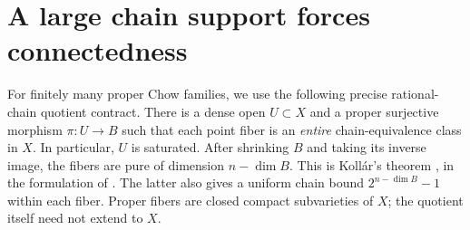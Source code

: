 \documentclass[11pt]{article}
\theoremstyle{definition}\newtheorem{definition}[theorem]{Definition}
\theoremstyle{remark}\newtheorem{remark}[theorem]{Remark}
\begin{document}
\section{A large chain support forces connectedness}\label{sec:quotient}
For finitely many proper Chow families, we use the following precise
rational-chain quotient contract. There is a dense open $U\subset X$ and
a proper surjective morphism $\pi:U\to B$ such that each point fiber is
an \emph{entire} chain-equivalence class in $X$. In particular, $U$ is
saturated. After shrinking $B$ and taking its inverse image, the fibers
are pure of dimension $n-\dim B$. This is Koll\'ar's theorem
\cite[IV.4.16]{kollar}, in the formulation of
\cite[Theorem 3.2]{fujita}. The latter also gives a uniform chain bound
$2^{n-\dim B}-1$ within each fiber. Proper fibers are closed compact
subvarieties of $X$; the quotient itself need not extend to $X$.
\end{document}
